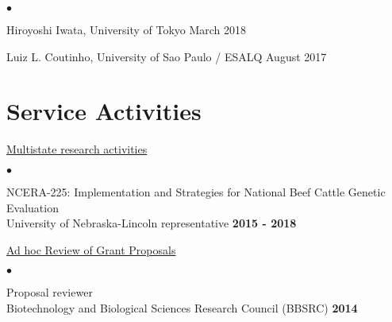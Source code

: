 \documentclass[margin,line,10pt]{res}
\newenvironment{list2}{
  \begin{list}{$\bullet$}{%
      \setlength{\itemsep}{0in}
      \setlength{\parsep}{0in} \setlength{\parskip}{0in}
      \setlength{\topsep}{0in} \setlength{\partopsep}{0in} 
      \setlength{\leftmargin}{0.2in}}}{\end{list}}
\begin{document}
\begin{resume}
\begin{list2}
\item Hiroyoshi Iwata, University of Tokyo  \hfill March 2018\\
    
\item Luiz L. Coutinho, University of Sao Paulo / ESALQ  \hfill August 2017\\


\end{list2}












\vspace{0.5cm}
\section{\sc Service Activities}



\begin{flushleft}
\hspace{0.3cm} \underline{Multistate research activities}
\end{flushleft}
\begin{list2}


\item NCERA-225: Implementation and Strategies for National Beef Cattle Genetic Evaluation \\ University of Nebraska-Lincoln representative \hfill  \textbf{2015 - 2018}\\
\end{list2}



\begin{flushleft}
\hspace{0.3cm} \underline{Ad hoc Review of Grant Proposals}
\end{flushleft}
\begin{list2}
\item Proposal reviewer  \\
  Biotechnology and Biological Sciences Research Council (BBSRC) \hfill \textbf{2014}  \\
\end{list2}


\end{resume}
\end{document}

